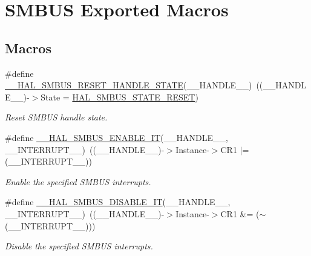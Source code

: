 \hypertarget{group___s_m_b_u_s___exported___macros}{}\section{S\+M\+B\+US Exported Macros}
\label{group___s_m_b_u_s___exported___macros}
\subsection*{Macros}
\begin{DoxyCompactItemize}
\item 
\#define \hyperlink{group___s_m_b_u_s___exported___macros_gaf61fb602592d45225b4c7a4f4ac95127}{\+\_\+\+\_\+\+H\+A\+L\+\_\+\+S\+M\+B\+U\+S\+\_\+\+R\+E\+S\+E\+T\+\_\+\+H\+A\+N\+D\+L\+E\+\_\+\+S\+T\+A\+TE}(\+\_\+\+\_\+\+H\+A\+N\+D\+L\+E\+\_\+\+\_\+)~((\+\_\+\+\_\+\+H\+A\+N\+D\+L\+E\+\_\+\+\_\+)-\/$>$State = \hyperlink{group___h_a_l__state__definition_ga10d0d653875df77cad851a38a0ebead9}{H\+A\+L\+\_\+\+S\+M\+B\+U\+S\+\_\+\+S\+T\+A\+T\+E\+\_\+\+R\+E\+S\+ET})
\begin{DoxyCompactList}\small\item\em Reset S\+M\+B\+US handle state. \end{DoxyCompactList}\item 
\#define \hyperlink{group___s_m_b_u_s___exported___macros_ga5c97c2d61aea9155e23c86106e6d29fc}{\+\_\+\+\_\+\+H\+A\+L\+\_\+\+S\+M\+B\+U\+S\+\_\+\+E\+N\+A\+B\+L\+E\+\_\+\+IT}(\+\_\+\+\_\+\+H\+A\+N\+D\+L\+E\+\_\+\+\_\+,  \+\_\+\+\_\+\+I\+N\+T\+E\+R\+R\+U\+P\+T\+\_\+\+\_\+)~((\+\_\+\+\_\+\+H\+A\+N\+D\+L\+E\+\_\+\+\_\+)-\/$>$Instance-\/$>$C\+R1 $\vert$= (\+\_\+\+\_\+\+I\+N\+T\+E\+R\+R\+U\+P\+T\+\_\+\+\_\+))
\begin{DoxyCompactList}\small\item\em Enable the specified S\+M\+B\+US interrupts. \end{DoxyCompactList}\item 
\#define \hyperlink{group___s_m_b_u_s___exported___macros_gab7b90ad17b325c2e5a8c50736f148892}{\+\_\+\+\_\+\+H\+A\+L\+\_\+\+S\+M\+B\+U\+S\+\_\+\+D\+I\+S\+A\+B\+L\+E\+\_\+\+IT}(\+\_\+\+\_\+\+H\+A\+N\+D\+L\+E\+\_\+\+\_\+,  \+\_\+\+\_\+\+I\+N\+T\+E\+R\+R\+U\+P\+T\+\_\+\+\_\+)~((\+\_\+\+\_\+\+H\+A\+N\+D\+L\+E\+\_\+\+\_\+)-\/$>$Instance-\/$>$C\+R1 \&= ($\sim$(\+\_\+\+\_\+\+I\+N\+T\+E\+R\+R\+U\+P\+T\+\_\+\+\_\+)))
\begin{DoxyCompactList}\small\item\em Disable the specified S\+M\+B\+US interrupts. \end{DoxyCompactList}\item 

\end{DoxyCompactItemize}
